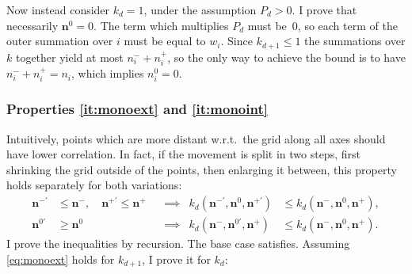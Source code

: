 \documentclass[a4paper]{article}
\newcommand{\nvecs}{\mathbf n^-, \mathbf n^0, \mathbf n^+}
\theoremstyle{definition}
\begin{document}
    Now instead consider $k_d = 1$, under the assumption $P_d > 0$. I prove
    that necessarily $\mathbf n^0 = 0$. The term which multiplies $P_d$ must
    be~0, so each term of the outer summation over $i$ must be equal to $w_i$.
    Since $k_{d+1} \le 1$ the summations over $k$ together yield at most $n^-_i
    + n^+_i$, so the only way to achieve the bound is to have $n^-_i
    + n^+_i = n_i$, which implies $n^0_i = 0$.
    
    \subsubsection{Properties \ref{it:monoext} and \ref{it:monoint}}
    
    Intuitively, points which are more distant w.r.t.\ the grid along all axes
    should have lower correlation. In fact, if the movement is split in two
    steps, first shrinking the grid outside of the points, then enlarging it
    between, this property holds separately for both variations:
    \begin{align}
        \mathbf n^{-\prime} &\le \mathbf n^-, \quad
        \mathbf n^{+\prime} \le \mathbf n^+ &&\implies&
        k_d(\mathbf n^{-\prime}, \mathbf n^0, \mathbf n^{+\prime}) &\le
        k_d(\nvecs), \label{eq:monoext} \\
        \mathbf n^{0\prime} &\ge \mathbf n^0 &&\implies&
        k_d(\mathbf n^-, \mathbf n^{0\prime}, \mathbf n^+) &\le k_d(\nvecs).
        \label{eq:monoint}
    \end{align}
    I prove the inequalities by recursion. The base case satisfies. Assuming
    \autoref{eq:monoext} holds for $k_{d+1}$, I prove it for $k_d$:
\end{document}
